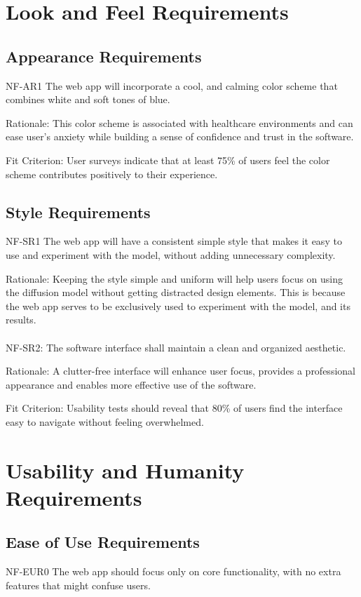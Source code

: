 \documentclass[12pt]{article}
\begin{document}
\section{Look and Feel Requirements}
\subsection{Appearance Requirements}
NF-AR1 The web app will incorporate a cool, and calming color scheme that combines white and soft 
tones of blue.

Rationale: This color scheme is associated with healthcare environments and can ease user’s 
anxiety while building a sense of confidence and trust in the software.

Fit Criterion: User surveys indicate that at least 75\% of users feel the color scheme contributes 
positively to their experience.

\subsection{Style Requirements}
NF-SR1 The web app will have a consistent simple style that makes it easy to use and experiment 
with the model, without adding unnecessary complexity.

Rationale: Keeping the style simple and uniform will help users focus on using the diffusion model 
without getting distracted design elements. This is because the web app serves to be exclusively 
used to experiment with the model, and its results. 
\\\\
NF-SR2: The software interface shall maintain a clean and organized aesthetic.

Rationale: A clutter-free interface will enhance user focus, provides a professional appearance 
and enables more effective use of the software.

Fit Criterion: Usability tests should reveal that 80\% of users find the interface easy to 
navigate without feeling overwhelmed.

\section{Usability and Humanity Requirements}
\subsection{Ease of Use Requirements}
NF-EUR0 The web app should focus only on core functionality, with no extra features that might 
confuse users.
\end{document}
